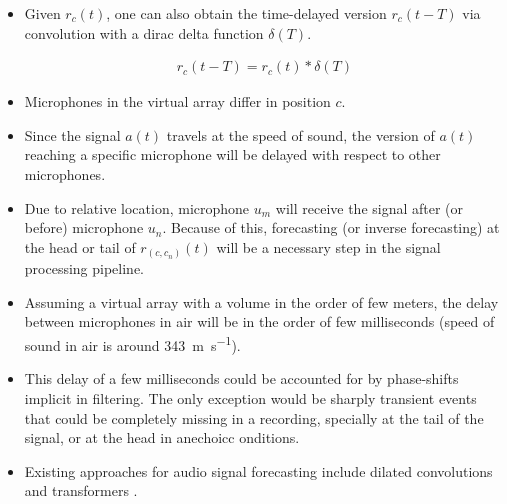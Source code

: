 \documentclass[14pt]{extarticle}
\begin{document}
\begin{itemize}

\item Given $r_c(t)$, one can also obtain the time-delayed version $r_c(t-T)$ via convolution with a dirac delta function $\delta(T)$. 

\begin{align*}
r_c(t-T) = r_c(t) \ast \delta(T)
\end{align*}

\item Microphones in the virtual array differ in position $c$. 

\item Since the signal $a(t)$ travels at the speed of sound, the version of $a(t)$ reaching a specific microphone will be delayed with respect to other microphones.

\item Due to relative location, microphone $u_m$ will receive the signal after (or before) microphone $u_n$. Because of this, forecasting (or inverse forecasting) at the head or tail of $r_{(c,c_n)}(t)$ will be a necessary step in the signal processing pipeline. 

\item Assuming a virtual array with a volume in the order of few meters, the delay between microphones in air will be in the order of few milliseconds (speed of sound in air is around \SI{343}{\metre\per\second}).

\item This delay of a few milliseconds could be accounted for by phase-shifts implicit in filtering. The only exception would be sharply transient events that could be completely missing in a recording, specially at the tail of the signal, or at the head in anechoicc onditions.

\item Existing approaches for audio signal forecasting include dilated convolutions \cite{oord2016wavenet} and transformers \cite{child2019generating}. 

\end{itemize}
\end{document}
